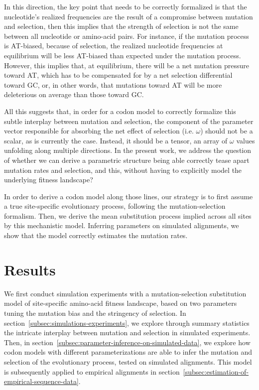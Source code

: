 In this direction, the key point that needs to be correctly formalized is that the nucleotide's realized frequencies are the result of a compromise between mutation and selection, then this implies that the strength of selection is not the same between all nucleotide or amino-acid pairs.
For instance, if the mutation process is AT-biased, because of selection, the realized nucleotide frequencies at equilibrium will be less AT-biased than expected under the mutation process.
However, this implies that, at equilibrium, there will be a net mutation pressure toward AT, which has to be compensated for by a net selection differential toward GC, or, in other words, that mutations toward AT will be more deleterious on average than those toward GC.

All this suggests that, in order for a codon model to correctly formalize this subtle interplay between mutation and selection, the component of the parameter vector responsible for absorbing the net effect of selection (i.e. $\omega$) should not be a scalar, as is currently the case.
Instead, it should be a tensor, an array of $\omega$ values unfolding along multiple directions.
In the present work, we address the question of whether we can derive a parametric structure being able correctly tease apart mutation rates and selection, and this, without having to explicitly model the underlying fitness landscape?

In order to derive a codon model along those lines, our strategy is to first assume a true site-specific evolutionary process, following the mutation-selection formalism.
Then, we derive the mean substitution process implied across all sites by this mechanistic model.
Inferring parameters on simulated alignments, we show that the model correctly estimates the mutation rates.



\section{Results}
\label{sec:results}

We first conduct simulation experiments with a mutation-selection substitution model of site-specific amino-acid fitness landscape, based on two parameters tuning the mutation bias and the stringency of selection.
In section~\ref{subsec:simulations-experiments}, we explore through summary statistics the intricate interplay between mutation and selection in simulated experiments.
Then, in section~\ref{subsec:parameter-inference-on-simulated-data}, we explore how codon models with different parameterizations are able to infer the mutation and selection of the evolutionary process, tested on simulated alignments.
This model is subsequently applied to empirical alignments in section~\ref{subsec:estimation-of-empirical-sequence-data}.

